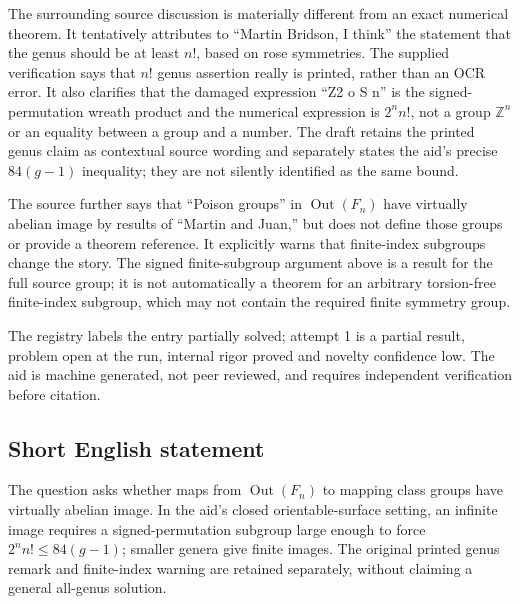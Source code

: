 \documentclass[11pt]{article}
\newcommand{\Z}{\mathbb{Z}}
\begin{document}
The surrounding source discussion is materially different from an exact numerical theorem. It tentatively attributes to ``Martin Bridson, I think'' the statement that the genus should be at least \(n!\), based on rose symmetries. The supplied verification says that \(n!\) genus assertion really is printed, rather than an OCR error. It also clarifies that the damaged expression ``Z2 o S n'' is the signed-permutation wreath product and the numerical expression is \(2^n n!\), not a group \(\Z^n\) or an equality between a group and a number. The draft retains the printed genus claim as contextual source wording and separately states the aid's precise \(84(g-1)\) inequality; they are not silently identified as the same bound.

The source further says that ``Poison groups'' in \(\operatorname{Out}(F_n)\) have virtually abelian image by results of ``Martin and Juan,'' but does not define those groups or provide a theorem reference. It explicitly warns that finite-index subgroups change the story. The signed finite-subgroup argument above is a result for the full source group; it is not automatically a theorem for an arbitrary torsion-free finite-index subgroup, which may not contain the required finite symmetry group.

The registry labels the entry partially solved; attempt 1 is a partial result, problem open at the run, internal rigor proved and novelty confidence low. The aid is machine generated, not peer reviewed, and requires independent verification before citation.
\subsection{Short English statement}
The question asks whether maps from \(\operatorname{Out}(F_n)\) to mapping class groups have virtually abelian image. In the aid's closed orientable-surface setting, an infinite image requires a signed-permutation subgroup large enough to force \(2^n n!\le84(g-1)\); smaller genera give finite images. The original printed genus remark and finite-index warning are retained separately, without claiming a general all-genus solution.
\end{document}
